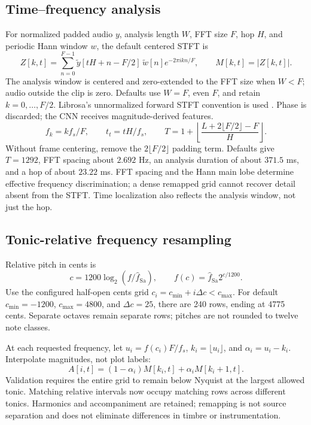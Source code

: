 \documentclass[11pt,a4paper]{article}
\begin{document}
\subsection{Time--frequency analysis}
For normalized padded audio $y$, analysis length $W$, FFT size $F$, hop $H$, and
periodic Hann window $w$, the default centered STFT is
\[
Z[k,t]=\sum_{n=0}^{F-1}\widetilde y[tH+n-F/2]\,\widetilde w[n]
                    e^{-2\pi i kn/F},\qquad M[k,t]=|Z[k,t]|.
\]
The analysis window is centered and zero-extended to the FFT size when $W<F$;
audio outside the clip is zero. Defaults use $W=F$, even $F$, and retain
$k=0,\ldots,F/2$. Librosa's unnormalized forward STFT convention is used
\cite{librosa}. Phase is discarded; the CNN receives magnitude-derived features.
\[
f_k=kf_s/F,\qquad t_t=tH/f_s,\qquad
T=1+\left\lfloor\frac{L+2\lfloor F/2\rfloor-F}{H}\right\rfloor.
\]
Without frame centering, remove the $2\lfloor F/2\rfloor$ padding term.
Defaults give $T=1292$, FFT spacing about $2.692$ Hz, an analysis duration of
about $371.5$ ms, and a hop of about $23.22$ ms. FFT spacing and the Hann main
lobe determine effective frequency discrimination; a dense remapped grid cannot
recover detail absent from the STFT. Time localization also reflects the analysis
window, not just the hop.

\subsection{Tonic-relative frequency resampling}
Relative pitch in cents is
\[
c=1200\log_2(f/\widehat f_{\mathrm{Sa}}),\qquad
f(c)=\widehat f_{\mathrm{Sa}}2^{c/1200}.
\]
Use the configured half-open cents grid $c_i=c_{\min}+i\Delta c<c_{\max}$.
For default $c_{\min}=-1200$, $c_{\max}=4800$, and $\Delta c=25$, there are
240 rows, ending at 4775 cents. Separate octaves remain separate rows; pitches
are not rounded to twelve note classes.

At each requested frequency, let $u_i=f(c_i)F/f_s$, $k_i=\lfloor u_i\rfloor$,
and $\alpha_i=u_i-k_i$. Interpolate magnitudes, not plot labels:
\[
A[i,t]=(1-\alpha_i)M[k_i,t]+\alpha_iM[k_i+1,t].
\]
Validation requires the entire grid to remain below Nyquist at the largest
allowed tonic. Matching relative intervals now occupy matching rows across
different tonics. Harmonics and accompaniment are retained; remapping is not
source separation and does not eliminate differences in timbre or instrumentation.
\end{document}
